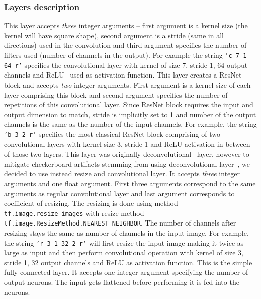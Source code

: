 \subsubsection{Layers description}

\begin{description}
 This layer accepts {\em three} integer arguments -- first argument is a kernel size (the kernel will have square shape), second argument is a stride (same in all directions) used in the convolution and third argument specifies the number of filters used (number of channels in the output). For example the string \texttt{'c-7-1-64-r'} specifies the convolutional layer with kernel of size 7, stride 1, 64 output channels and ReLU~\cite{relu} used as activation function.
 This layer creates a ResNet block and accepts {\em two} integer arguments. First argument is a kernel size of each layer comprising this block and second argument specifies the number of repetitions of this convolutional layer. Since ResNet block requires the input and output dimension to match, stride is implicitly set to 1 and number of the output channels is the same as the number of the input channels. For example, the string \texttt{'b-3-2-r'} specifies the most classical ResNet block comprising of two convolutional layers with kernel size 3, stride 1 and ReLU activation in between of those two layers.
 This layer was originally deconvolutional~\cite{deconv} layer, however to mitigate checkerboard artifacts stemming from using deconvolutional layer~\cite{resizeconv}, we decided to use instead resize and convolutional layer. It accepts {\em three} integer arguments and one float argument. First three arguments correspond to the same arguments as regular convolutional layer and last argument corresponds to coefficient of resizing. The resizing is done using method \texttt{tf.image.resize\_images} with resize method \texttt{tf.image.ResizeMethod.NEAREST\_NEIGHBOR}. The number of channels after resizing stays the same as number of channels in the input image. For example, the string \texttt{'r-3-1-32-2-r'} will first resize the input image making it twice as large as input and then perform convolutional operation with kernel of size 3, stride 1, 32 output channels and ReLU as activation function.
 This is the simple fully connected layer. It accepts one integer argument specifying the number of output neurons. The input gets flattened before performing it is fed into the neurons.
\end{description}


